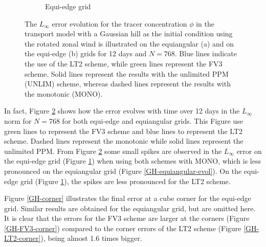 \documentclass[preprint,12pt]{elsarticle}
\begin{document}
\begin{linenumbers}
\begin{figure}[!htb]
\begin{subfigure}{0.45\textwidth}
		\caption{Equi-edge grid\label{GH-equiedge-evol}}
	\end{subfigure}
	\caption{
The $L_{\infty}$ error evolution for the tracer concentration $\phi$ in the transport model with a Gaussian hill as the initial condition using the rotated zonal wind is illustrated on the equiangular  (a) and on the equi-edge (b) grids for 12 days and $N=768$.
Blue lines indicate the use of the LT2 scheme, while green lines represent the FV3 scheme.
Solid lines represent the results with the unlimited PPM (UNLIM) scheme, whereas dashed lines represent the results with the monotonic (MONO).
\label{GH-linf-evol}}
\end{figure}

In fact, Figure \ref{GH-linf-evol} shows how the error evolves with time over 12 days in the $L_{\infty}$ norm for $N=768$ for both equi-edge and equiangular grids.
This Figure use green lines to represent the FV3 scheme and blue lines to represent the LT2 scheme.
Dashed lines represent the monotonic while solid lines represent the unlimited PPM.
From Figure \ref{GH-linf-evol} some small spikes are observed in the $L_{\infty}$ error
on the equi-edge grid (Figure \ref{GH-equiedge-evol}) when using both schemes with MONO, which is less pronounced on the equiangular grid (Figure \ref{GH-equiangular-evol}).
On the equi-edge grid (Figure \ref{GH-equiedge-evol}), the spikes are less pronounced for the LT2 scheme.

Figure \ref{GH-corner} illustrates the final error at a cube corner for the equi-edge grid. Similar results are obtained for the equiangular grid, but are omitted here.
It is clear that the errors for the FV3 scheme are larger at the corners (Figure \ref{GH-FV3-corner}) compared to the corner errors of the LT2 scheme (Figure \ref{GH-LT2-corner}), being almost 1.6 times bigger.


\end{linenumbers}
\end{document}
